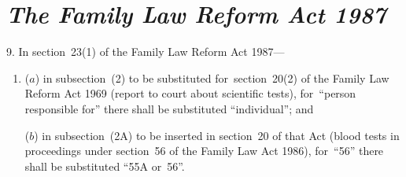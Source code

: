 \documentclass[12pt,a4paper]{article}
\begin{document}
\section*{\itshape The Family Law Reform Act 1987}

9. In section~23(1)  of the Family Law Reform Act 1987—
\begin{enumerate}\item[]
($a$) in subsection~(2)  to be substituted for~section~20(2)  of the Family Law Reform Act 1969 (report to court about scientific tests), for~“person responsible for” there shall be substituted “individual”; and

($b$) in subsection~(2A)  to be inserted in section~20 of that Act (blood tests in proceedings under section~56 of the Family Law Act 1986), for~“56” there shall be substituted “55A or~56”.
\end{enumerate}


%
%
%
%
%
\end{document}
